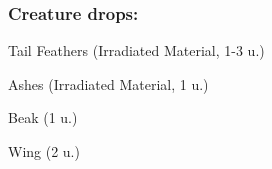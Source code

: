 \documentclass[11pt,a4paper,twocolumn]{book}
\begin{document}
%	
%	
%	
%		
%	
%		
%	

%		

%		

%		

%		
%		
%		
%		
	
	\subsubsection*{Creature drops:}
	\begin{compactitem}
		\item Tail Feathers (Irradiated Material, 1-3 u.)
		\item Ashes (Irradiated Material, 1 u.)
		\item Beak (1 u.)
		\item Wing (2 u.)
	\end{compactitem}
	
\end{document}
